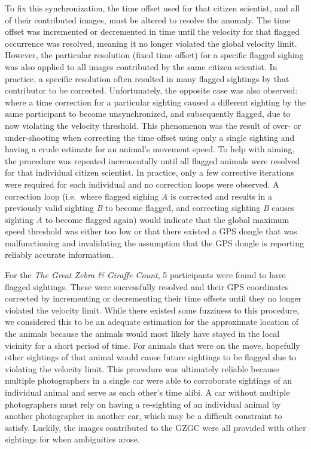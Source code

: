 To fix this synchronization, the time offset used for that citizen scientist, and all of their contributed images, must be altered to resolve the anomaly.  The time offset was incremented or decremented in time until the velocity for that flagged occurrence was resolved, meaning it no longer violated the global velocity limit.  However, the particular resolution (fixed time offset) for a specific flagged sighing was also applied to all images contributed by the same citizen scientist.  In practice, a specific resolution often resulted in many flagged sightings by that contributor to be corrected.  Unfortunately, the opposite case was also observed: where a time correction for a particular sighting caused a different sighting by the same participant to become unsynchronized, and subsequently flagged, due to now violating the velocity threshold.  This phenomenon was the result of over- or under-shooting when correcting the time offset using only a single sighting and having a crude estimate for an animal's movement speed.  To help with aiming, the procedure was repeated incrementally until all flagged animals were resolved for that individual citizen scientist.   In practice, only a few corrective iterations were required for each individual and no correction loops were observed.  A correction loop (i.e.\ where flagged sighing \textit{A} is corrected and results in a previously valid sighting \textit{B} to become flagged, and correcting sighting \textit{B} causes sighting \textit{A} to become flagged again) would indicate that the global maximum speed threshold was either too low or that there existed a GPS dongle that was malfunctioning and invalidating the assumption that the GPS dongle is reporting reliably accurate information.

For the \textit{The Great Zebra \& Giraffe Count}, 5 participants were found to have flagged sightings.  These were successfully resolved and their GPS coordinates corrected by incrementing or decrementing their time offsets until they no longer violated the velocity limit.  While there existed some fuzziness to this procedure, we considered this to be an adequate estimation for the approximate location of the animals because the animals would most likely have stayed in the local vicinity for a short period of time.  For animals that were on the move, hopefully other sightings of that animal would cause future sightings to be flagged due to violating the velocity limit.  This procedure was ultimately reliable because multiple photographers in a single car were able to corroborate sightings of an individual animal and serve as each other's time alibi.  A car without multiple photographers must rely on having a re-sighting of an individual animal by another photographer in another car, which may be a difficult constraint to satisfy.  Luckily, the images contributed to the GZGC were all provided with other sightings for when ambiguities arose.


